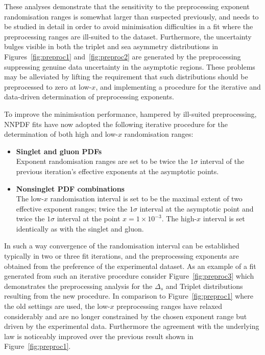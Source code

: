 These analyses demonstrate that the sensitivity to the preprocessing exponent randomisation ranges is somewhat larger than suspected previously, and needs to be studied in detail in order to avoid minimisation difficulties in a fit where the preprocessing ranges are ill-suited to the dataset. Furthermore, the uncertainty bulges visible in both the triplet and sea asymmetry distributions in Figures~\ref{fig:preproc1} and~\ref{fig:preproc2} are generated by the preprocessing suppressing genuine data uncertainty in the asymptotic regions. These problems may be alleviated by lifting the requirement that such distributions should be preprocessed to zero at low-$x$, and implementing a procedure for the iterative and data-driven determination of preprocessing exponents.

To improve the minimisation performance, hampered by ill-suited preprocessing, NNPDF fits have now adopted the following iterative procedure for the determination of both high and low-$x$ randomisation ranges:

\begin{itemize}
\item \textbf{Singlet and gluon PDFs}\\
Exponent randomisation ranges are set to be twice the $1\sigma$ interval of the previous iteration's effective exponents
at the asymptotic points.
\clearpage
\item \textbf{Nonsinglet PDF combinations}\\
The low-$x$ randomisation interval is set to be the maximal extent of two effective exponent ranges; twice the $1\sigma$ interval at the asymptotic point and twice the $1\sigma$ interval at the point $x=1\times 10^{-3}$. The high-$x$ interval is set identically as with the singlet and gluon.
\end{itemize} 

In such a way convergence of the randomisation interval can be established typically in two or three fit iterations, and the preprocessing exponents are obtained from the preference of the experimental dataset. As an example of a fit generated from such an iterative procedure consider Figure~\ref{fig:preproc3} which demonstrates the preprocessing analysis for the $\Delta_s$ and Triplet distributions resulting from the new procedure. In comparison to Figure~\ref{fig:preproc1} where the old settings are used, the low-$x$ preprocessing ranges have relaxed considerably and are no longer constrained by the chosen exponent range but driven by the experimental data. Furthermore the agreement with the underlying law is noticeably improved over the previous result shown in Figure~\ref{fig:preproc1}. 


